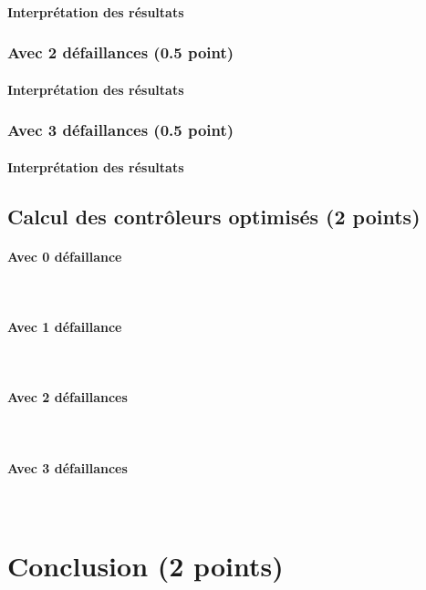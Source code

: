 \documentclass[a4paper]{book}
\begin{document}
\paragraph{Interprétation des résultats}

\subsubsection{Avec 2 défaillances (0.5 point)}




%
\paragraph{Interprétation des résultats}

\subsubsection{Avec 3 défaillances (0.5 point)}




%
\paragraph{Interprétation des résultats}

\subsection{Calcul des contrôleurs optimisés (2 points)}
\paragraph{Avec 0 défaillance}\ \\


\paragraph{Avec 1 défaillance}\ \\


\paragraph{Avec 2 défaillances}\ \\


\paragraph{Avec 3 défaillances}\ \\


\section{Conclusion (2 points)}
\end{document}
